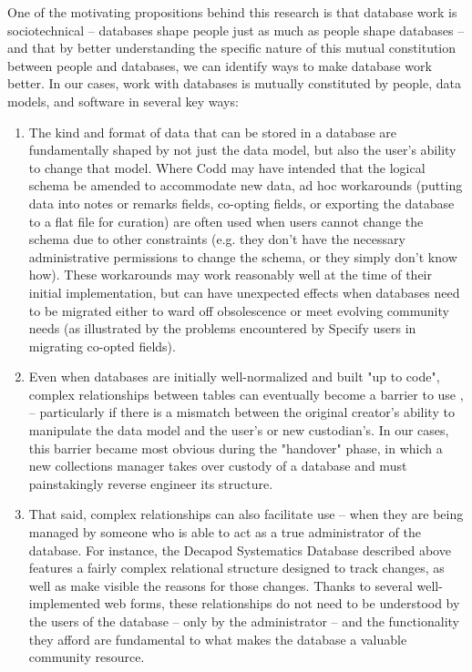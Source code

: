 One of the motivating propositions behind this research is that database work is sociotechnical -- databases shape people just as much as people shape databases -- and that by better understanding the specific nature of this mutual constitution between people and databases, we can identify ways to make database work better. In our cases, work with databases is mutually constituted by people, data models, and software in several key ways: 
\begin{enumerate}
\item The kind and format of data that can be stored in a database are fundamentally shaped by not just the data model, but also the user’s ability to change that model. Where Codd may have intended that the logical schema be amended to accommodate new data, ad hoc workarounds (putting data into notes or remarks fields, co-opting fields, or exporting the database to a flat file for curation) are often used when users cannot change the schema due to other constraints (e.g. they don't have the necessary administrative permissions to change the schema, or they simply don't know how). These workarounds may work reasonably well at the time of their initial implementation, but can have unexpected effects when databases need to be migrated either to ward off obsolescence or meet evolving community needs (as illustrated by the problems encountered by Specify users in migrating co-opted fields). 
\item Even when databases are initially well-normalized and built "up to code", complex relationships between tables can eventually become a barrier to use \cite{jagadish2007making}, – particularly if there is a mismatch between the original creator’s ability to manipulate the data model and the user’s or new custodian's. In our cases, this barrier became most obvious during the "handover" phase, in which a new collections manager takes over custody of a database and must painstakingly reverse engineer its structure. 
\item That said, complex relationships can also facilitate use -- when they are being managed by someone who is able to act as a true administrator of the database. For instance, the Decapod Systematics Database described above features a fairly complex relational structure designed to track changes, as well as make visible the reasons for those changes. Thanks to several well-implemented web forms, these relationships do not need to be understood by the users of the database – only by the administrator -- and the functionality they afford are fundamental to what makes the database a valuable community resource.

\end{enumerate}
